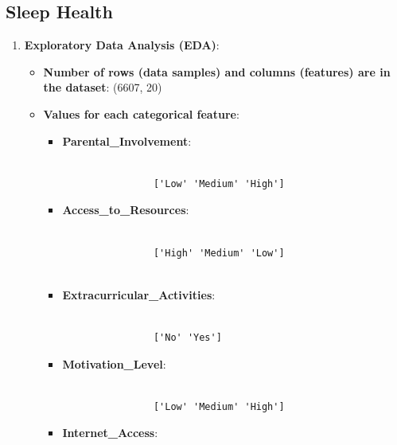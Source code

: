 \documentclass{article}
\begin{document}
\subsection*{Sleep Health}
\begin{enumerate}
    \item \textbf{Exploratory Data Analysis (EDA)}:
    
    \begin{itemize}

        \item \textbf{Number of rows (data samples) and columns (features) are in the dataset}: (6607, 20)
     
        \item \textbf{Values for each categorical feature}:
        \begin{itemize}

            \item \textbf{Parental\_Involvement}:
            \begin{verbatim}

                ['Low' 'Medium' 'High']

            \end{verbatim}

            \item \textbf{Access\_to\_Resources}:
            \begin{verbatim}

                ['High' 'Medium' 'Low']


            \end{verbatim}

            \item \textbf{Extracurricular\_Activities}:
            \begin{verbatim}

                ['No' 'Yes']

            \end{verbatim}

            \item \textbf{Motivation\_Level}:
            \begin{verbatim}

                ['Low' 'Medium' 'High']

            \end{verbatim}

            \item \textbf{Internet\_Access}:
            \begin{verbatim}


\end{verbatim}
\end{itemize}
\end{itemize}
\end{enumerate}
\end{document}

